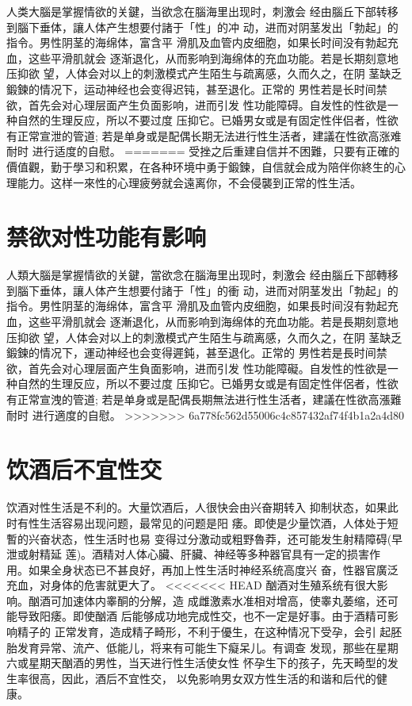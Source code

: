 \documentclass[12pt,UTF8]{ctexbook}
\begin{document}
人类大腦是掌握情欲的关鍵，当欲念在腦海里出现时，刺激会
经由腦丘下部转移到腦下垂体，讓人体产生想要付諸于「性」的冲
动，进而对阴茎发出「勃起」的指令。男性阴茎的海绵体，富含平
滑肌及血管内皮细胞，如果长时间没有勃起充血，这些平滑肌就会
逐渐退化，从而影响到海绵体的充血功能。若是长期刻意地压抑欲
望，人体会对以上的刺激模式产生陌生与疏离感，久而久之，在阴
茎缺乏鍛鍊的情况下，运动神经也会变得迟钝，甚至退化。正常的
男性若是长时间禁欲，首先会对心理层面产生负面影响，进而引发
性功能障碍。自发性的性欲是一种自然的生理反应，所以不要过度
压抑它。已婚男女或是有固定性伴侣者，性欲有正常宣泄的管道;
若是单身或是配偶长期无法进行性生活者，建議在性欲高涨难耐时
进行适度的自慰。
=======
受挫之后重建自信并不困難，只要有正確的價值觀，勤于學习和积累，在各种环境中勇于鍛鍊，自信就会成为陪伴你終生的心理能力。这样一來性的心理疲勞就会遠离你，不会侵襲到正常的性生活。

\section{禁欲对性功能有影响}

人類大腦是掌握情欲的关鍵，當欲念在腦海里出现时，刺激会
经由腦丘下部轉移到腦下垂体，讓人体产生想要付諸于「性」的衝
动，进而对阴茎发出「勃起」的指令。男性阴茎的海绵体，富含平
滑肌及血管内皮细胞，如果長时间沒有勃起充血，这些平滑肌就会
逐漸退化，从而影响到海绵体的充血功能。若是長期刻意地压抑欲
望，人体会对以上的刺激模式产生陌生与疏离感，久而久之，在阴
茎缺乏鍛鍊的情况下，運动神经也会变得遲鈍，甚至退化。正常的
男性若是長时间禁欲，首先会对心理层面产生負面影响，进而引发
性功能障礙。自发性的性欲是一种自然的生理反应，所以不要过度
压抑它。已婚男女或是有固定性伴侶者，性欲有正常宣洩的管道;
若是单身或是配偶長期無法进行性生活者，建議在性欲高漲難耐时
进行適度的自慰。
>>>>>>> 6a778fc562d55006c4c857432af74f4b1a2a4d80

\section{饮酒后不宜性交}

饮酒对性生活是不利的。大量饮酒后，人很快会由兴奋期转入
抑制状态，如果此时有性生活容易出现问题，最常见的问题是阳
痿。即使是少量饮酒，人体处于短暫的兴奋状态，性生活时也易
变得过分激动或粗野魯莽，还可能发生射精障碍(早泄或射精延
莲)。酒精对人体心臟、肝臟、神经等多种器官具有一定的损害作
用。如果全身状态已不甚良好，再加上性生活时神经系统高度兴
奋，性器官廣泛充血，对身体的危害就更大了。
<<<<<<< HEAD
酗酒对生殖系统有很大影响。酗酒可加速体内睾酮的分解，造
成雌激素水准相对增高，使睾丸萎缩，还可能导致阳痿。即使酗酒
后能够成功地完成性交，也不一定是好事。由于酒精可影响精子的
正常发育，造成精子畸形，不利于優生，在这种情况下受孕，会引
起胚胎发育异常、流产、低能儿，将来有可能生下癡呆儿。有调查
发现，那些在星期六或星期天酗酒的男性，当天进行性生活使女性
怀孕生下的孩子，先天畸型的发生率很高，因此，酒后不宜性交，
以免影响男女双方性生活的和谐和后代的健康。
\end{document}
